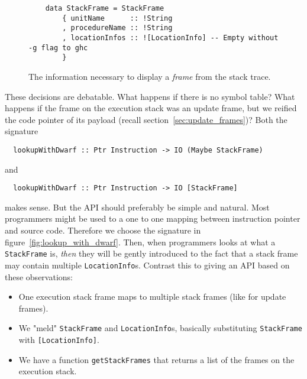\begin{figure}
\begin{mdframed}
  \begin{verbatim}
    data StackFrame = StackFrame
        { unitName      :: !String
        , procedureName :: !String
        , locationInfos :: ![LocationInfo] -- Empty without -g flag to ghc
        }
  \end{verbatim}
  \caption{The information necessary to display a \emph{frame} from the stack
    trace.}
  \label{fig:stack_frame}
\end{mdframed}
\end{figure}

These decisions are debatable. What happens if there is no symbol
table? What happens if the frame on the execution stack was an update
frame, but we reified the code pointer of its payload (recall section~\ref{sec:update_frames})? Both the signature

\begin{verbatim}
  lookupWithDwarf :: Ptr Instruction -> IO (Maybe StackFrame)
\end{verbatim}

and

\begin{verbatim}
  lookupWithDwarf :: Ptr Instruction -> IO [StackFrame]
\end{verbatim}

makes sense. But the API should preferably be simple and natural. Most
programmers might be used to a one to one mapping between instruction pointer
and source code. Therefore we choose the signature in figure~\ref{fig:lookup_with_dwarf}. Then, when programmers looks at what a
\texttt{StackFrame} is, \emph{then} they will be gently introduced to
the fact that a stack frame may contain multiple \texttt{LocationInfo}s.
Contrast this to giving an API based on these observations:

\begin{itemize}
  \item
    One execution stack frame maps to multiple stack frames (like for
    update frames).
  \item
    We "meld" \texttt{StackFrame} and \texttt{LocationInfo}s, basically
    substituting \texttt{StackFrame} with \texttt{[LocationInfo]}.
  \item
    We have a function \texttt{getStackFrames} that returns a list of the
    frames on the execution stack.
\end{itemize}

